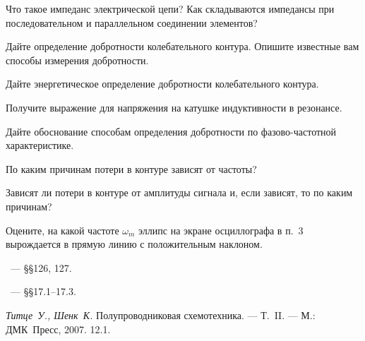 \begin{lab:questions}
    \item Что такое импеданс электрической цепи?
    Как складываются импедансы при последовательном и параллельном
    соединении элементов?
    
    \item Дайте определение добротности колебательного контура.
    Опишите известные вам способы измерения добротности.
    
    \item Дайте энергетическое определение добротности колебательного контура.

    \item  Получите выражение для напряжения на катушке индуктивности  в
резонансе.

    \item Дайте обоснование способам определения добротности по
фазово-частотной характеристике.

    \item По каким причинам потери в контуре зависят от частоты?

    \item *Зависят ли потери в контуре от амплитуды сигнала и, если зависят, то
по каким причинам?

    \item *Оцените, на какой частоте $\omega_m$ эллипс на экране осциллографа в
п.~3 вырождается в прямую линию с положительным наклоном.
\end{lab:questions}


\begin{lab:literature}
        \item \SivuhinIII~--- \S\S126, 127.
        \item \Kirichenko~--- \S\S17.1--17.3.
    \item *\emph{Титце~У., Шенк~К.} Полупроводниковая схемотехника.  --- Т.~II. ---
М.: ДМК~Пресс, 2007. 12.1.
\end{lab:literature}

